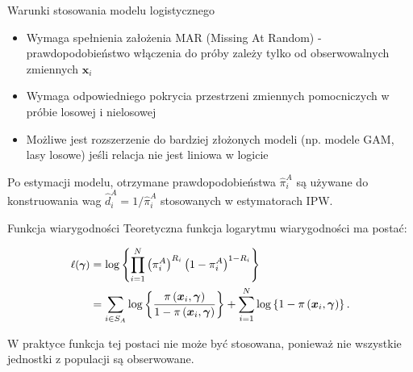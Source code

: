 \documentclass[10pt,ignorenonframetext, aspectratio=169]{beamer}
\newcommand{\bx}{\boldsymbol{x}}
\newcommand{\bgamma}{\boldsymbol{\gamma}}
\begin{document}
\begin{frame}{Warunki stosowania modelu logistycznego}
    \begin{itemize}
    \justifying
        \item Wymaga spełnienia założenia MAR (Missing At Random) - prawdopodobieństwo włączenia do próby zależy tylko od obserwowalnych zmiennych $\bx_i$
        \item Wymaga odpowiedniego pokrycia przestrzeni zmiennych pomocniczych w próbie losowej i nielosowej
        \item Możliwe jest rozszerzenie do bardziej złożonych modeli (np. modele GAM, lasy losowe) jeśli relacja nie jest liniowa w logicie
    \end{itemize}
    
    \vspace{1em}
    
    Po estymacji modelu, otrzymane prawdopodobieństwa $\hat{\pi}_i^A$ są używane do konstruowania wag $\hat{d}_i^A = 1/\hat{\pi}_i^A$ stosowanych w estymatorach IPW.
\end{frame}

\begin{frame}{Funkcja wiarygodności}
    Teoretyczna funkcja logarytmu wiarygodności ma postać:
    
    \begin{align}
    \small
    \ell(\bgamma) &= \log\left\{\prod_{i=1}^N \left(\pi_i^A\right)^{R_i}\left(1-\pi_i^A\right)^{1-R_i}\right\} \nonumber \\
    &= \sum_{i \in S_{A}} \log \left\{\frac{\pi\left(\bx_i, \bgamma\right)}{1-\pi\left(\bx_i, \bgamma\right)}\right\}+\sum_{i=1}^N \log \left\{1-\pi\left(\bx_i, \bgamma\right)\right\}.
    \end{align}
    
    \vspace{0.5em}
    
    W praktyce funkcja tej postaci nie może być stosowana, ponieważ nie wszystkie jednostki z populacji są obserwowane.
\end{frame}
\end{document}
